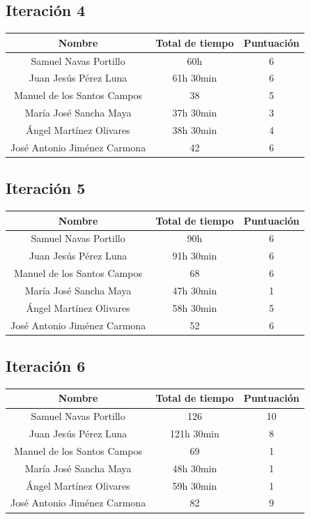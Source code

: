 \documentclass[11 pt]{book}
\begin{document}
		\subsection*{Iteración 4}			
			\begin{tabular}{|c|c|c|}
				\hline
				Nombre & Total de tiempo & Puntuación\\
				\hline
				Samuel Navas Portillo & 60h & 6\\
				Juan Jesús Pérez Luna & 61h 30min & 6\\
				Manuel de los Santos Campos & 38 & 5\\
				María José Sancha Maya & 37h 30min & 3\\
				Ángel Martínez Olivares & 38h 30min & 4\\
				José Antonio Jiménez Carmona & 42 & 6\\
				\hline
			\end{tabular}
			
		\subsection*{Iteración 5}			
			\begin{tabular}{|c|c|c|}
				\hline
				Nombre & Total de tiempo & Puntuación\\
				\hline
				Samuel Navas Portillo & 90h & 6\\
				Juan Jesús Pérez Luna & 91h 30min & 6\\
				Manuel de los Santos Campos & 68 & 6\\
				María José Sancha Maya & 47h 30min & 1\\
				Ángel Martínez Olivares & 58h 30min & 5\\
				José Antonio Jiménez Carmona & 52 & 6\\
				\hline
			\end{tabular}
			
		\subsection*{Iteración 6}			
			\begin{tabular}{|c|c|c|}
				\hline
				Nombre & Total de tiempo & Puntuación\\
				\hline
				Samuel Navas Portillo & 126 & 10\\
				Juan Jesús Pérez Luna & 121h 30min & 8\\
				Manuel de los Santos Campos & 69 & 1\\
				María José Sancha Maya & 48h 30min & 1\\
				Ángel Martínez Olivares & 59h 30min & 1\\
				José Antonio Jiménez Carmona & 82 & 9\\
				\hline
			\end{tabular}
			
\end{document}
